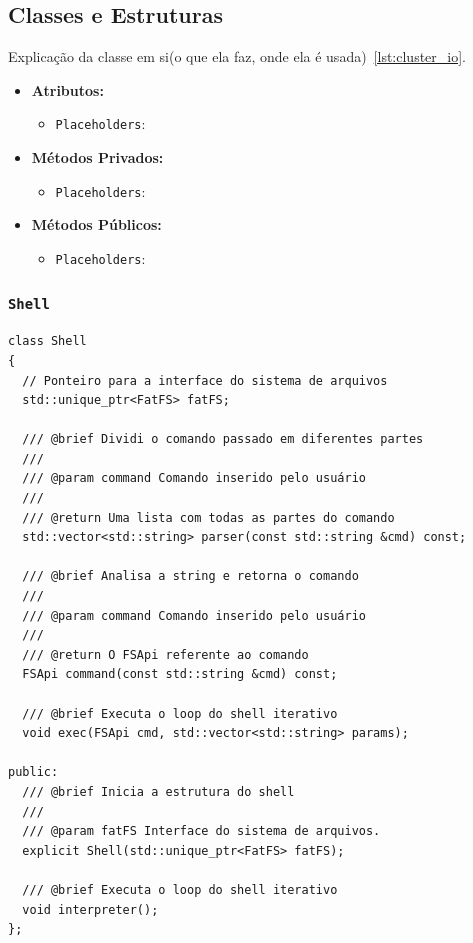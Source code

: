 \documentclass[
    12pt,				%
    oneside,   	        %
    a4paper,			%
    english,			%
    french,				%
    spanish,			%
    brazil,				%
    ]{pacotes/abntex2}
\begin{document}
\subsection{Classes e Estruturas}
\label{subsec:classes_estruturas}

Explicação da classe em si(o que ela faz, onde ela é usada)~\ref{lst:cluster_io}.

\begin{itemize}
    \item \textbf{Atributos:}
        \begin{itemize}
            \item \texttt{Placeholders}:
        \end{itemize}
    \item \textbf{Métodos Privados:}
        \begin{itemize}
            \item \texttt{Placeholders}:
        \end{itemize}
    \item \textbf{Métodos Públicos:}
        \begin{itemize}
            \item \texttt{Placeholders}:
        \end{itemize}
\end{itemize}


\subsubsection{\texttt{Shell}}
\label{subsubsec:shell}

\begin{lstlisting}[caption={Classe que implementa o \textit{shell}}, label={lst:shell}]
class Shell
{
  // Ponteiro para a interface do sistema de arquivos
  std::unique_ptr<FatFS> fatFS;

  /// @brief Dividi o comando passado em diferentes partes
  ///
  /// @param command Comando inserido pelo usuário
  ///
  /// @return Uma lista com todas as partes do comando
  std::vector<std::string> parser(const std::string &cmd) const;

  /// @brief Analisa a string e retorna o comando
  ///
  /// @param command Comando inserido pelo usuário
  ///
  /// @return O FSApi referente ao comando
  FSApi command(const std::string &cmd) const;

  /// @brief Executa o loop do shell iterativo
  void exec(FSApi cmd, std::vector<std::string> params);

public:
  /// @brief Inicia a estrutura do shell
  ///
  /// @param fatFS Interface do sistema de arquivos.
  explicit Shell(std::unique_ptr<FatFS> fatFS);

  /// @brief Executa o loop do shell iterativo
  void interpreter();
};
\end{lstlisting}
\end{document}
